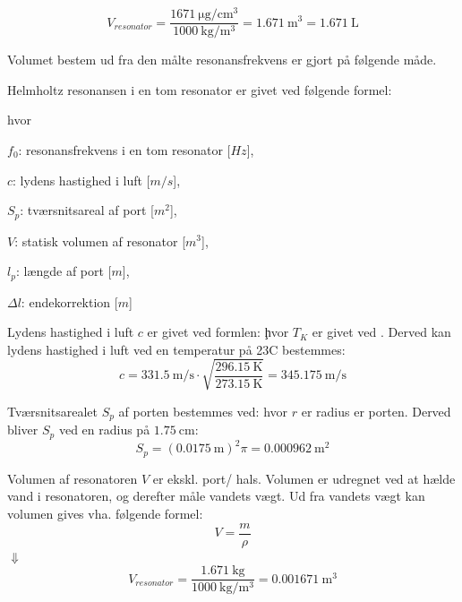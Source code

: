 \begin{equation}
V_{resonator}=\frac{\SI{1671}{\micro\gram \per \centi\meter^{3}}}{\SI{1000}{\kilo \gram \per \meter^{3}}}={\SI{1.671}{\meter^{3}}}={\SI{1.671}{\liter}}
\end{equation} 

Volumet bestem ud fra den målte resonansfrekvens er gjort på følgende måde.

Helmholtz resonansen i en tom resonator er givet ved følgende formel: \fnul

hvor 
\begin{description}[align=left, labelwidth=1in,labelindent=0.5cm]
\item $f_{0}$: resonansfrekvens i en tom resonator [$Hz$],\\
\item $c$: lydens hastighed i luft [$m/s$],\\
\item $S_{p}$: tværsnitsareal af port [$m^2$],\\
\item $V$: statisk volumen af resonator [$m^3$],\\
\item $l_{p}$: længde af port [$m$],\\
\item $\Delta l$: endekorrektion [$m$]\\
\end{description}
Lydens hastighed i luft $c$ er givet ved formlen: 
\c
hvor $T_{K}$ er givet ved \T. 
Derved kan lydens hastighed i luft ved en temperatur på 23\degree C bestemmes: 
\begin{equation}
		c = {\SI{331,5}{\meter / \second}} \cdot
		\sqrt{\frac{\SI{296,15}{\kelvin}}{\SI{273,15}{\kelvin}}} = {\SI{345,175}{\meter / \second}} 	\end{equation}
		
Tværsnitsarealet $S_{p}$ af porten bestemmes ved: 
\Sp 
hvor ${r}$ er radius er porten. 
Derved bliver $S_{p}$ ved en radius på ${\SI{1.75}{\centi \meter}}$:  
\begin{equation}
S_{p} = ({\SI{0,0175}{\meter}})^{2}\pi = {\SI{0,000962}{\meter^{2}}}	
\end{equation}  

Volumen af resonatoren $V$ er ekskl. port/ hals. Volumen er udregnet ved at hælde vand i resonatoren, og derefter måle vandets vægt. Ud fra vandets vægt kan volumen gives vha. følgende formel:  
\begin{equation}
  V=\frac{m}{\rho}
  \label{eq:vformel}
\end{equation}
$\Downarrow$
\begin{equation}
V_{resonator}=\frac{\SI{1,671}{\kilo\gram}}{\SI{1000}{\kilo \gram \per \meter^{3}}}={\SI{0,001671}{\meter^{3}}}
\end{equation}

